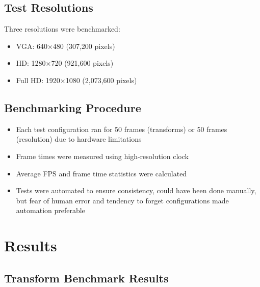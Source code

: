 \documentclass[12pt,a4paper]{article}
\begin{document}
\subsection{Test Resolutions}
Three resolutions were benchmarked:
\begin{itemize}
    \item VGA: 640×480 (307,200 pixels)
    \item HD: 1280×720 (921,600 pixels)
    \item Full HD: 1920×1080 (2,073,600 pixels)
\end{itemize}

\subsection{Benchmarking Procedure}
\begin{itemize}
    \item Each test configuration ran for 50 frames (transforms) or 50 frames (resolution) due to hardware limitations
    \item Frame times were measured using high-resolution clock
    \item Average FPS and frame time statistics were calculated
    \item Tests were automated to ensure consistency, could have been done manually, but fear of human error and tendency to forget configurations made automation preferable
\end{itemize}

\section{Results}

\subsection{Transform Benchmark Results}
\end{document}
